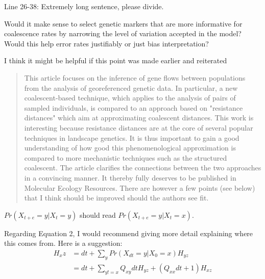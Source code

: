 \reply{
}

\begin{point}{Line 26-38:}
    Extremely long sentence, please divide.
\end{point}


\begin{point}{\revref}
    Would it make sense to select genetic markers that are more informative for
    coalescence rates by narrowing the level of variation accepted in the
    model? Would this help error rates justifiably or just bias interpretation?
\end{point}

\reply{
}

\begin{point}{\revref}
    I think it  might be helpful if this point was made earlier and reiterated
\end{point}

\reply{
}



\begin{quote}
    This article focuses on the inference of gene flows between populations from
    the analysis of georeferenced genetic data. In particular, a new
    coalescent-based technique, which applies to the analysis of pairs of
    sampled individuals, is compared to an approach based on "resistance
    distances" which aim at approximating coalescent distances. This work is
    interesting because resistance distances are at the core of several popular
    techniques in landscape genetics. It is thus important to gain a good
    understanding of how good this phenomenological approximation is compared
    to more mechanistic techniques such as the structured coalescent. The
    article clarifies the connections between the two approaches in a
    convincing manner. It thereby fully deserves to be published in Molecular
    Ecology Resources. There are however a few points (see below) that I think
    should be improved should the authors see fit.
\end{quote}



\begin{point}{}
    $Pr(X_{t+e}=y | X_t=y)$ should read $Pr(X_{t+e}=y | X_t=x)$.
\end{point}

\reply{
}

\begin{point}{}
    Regarding Equation 2, I would recommend giving more detail explaining where
    this comes from. Here is a suggestion:
    \begin{align*}
        H_xz &= dt + \sum_y Pr(X_{dt} = y | X_0 = x) H_{yz} \\
             &= dt + \sum_{y != x} Q_{xy} dt H_{yz} + (Q_{xx} dt + 1) H_{xz}
    \end{align*}
\end{point}

